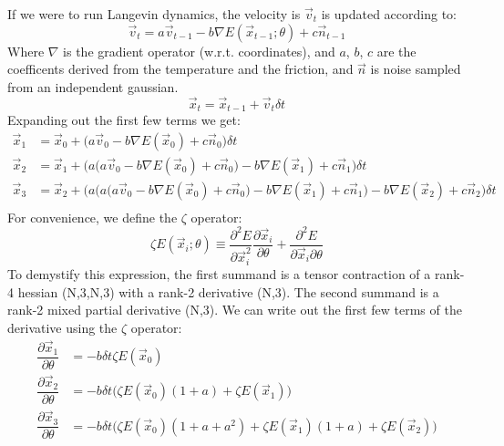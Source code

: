 \documentclass{article}
\begin{document}
If we were to run Langevin dynamics, the velocity is $\vec{v}_t$ is updated according to:
\begin{equation}
\vec{v}_t = a \vec{v}_{t-1} - b \nabla E(\vec{x}_{t-1};\theta) + c \vec{n}_{t-1}
\end{equation}
Where $\nabla$ is the gradient operator (w.r.t. coordinates), and $a$, $b$, $c$ are the coefficents derived from the temperature and the friction, and $\vec{n}$ is noise sampled from an independent gaussian.
\begin{equation}
\vec{x}_{t} = \vec{x}_{t-1} + \vec{v}_{t} \delta t
\end{equation}
Expanding out the first few terms we get:
\begin{equation}
\begin{split}
\vec{x}_1  &= \vec{x}_0 + \big(a \vec{v}_0 - b \nabla E(\vec{x}_0) + c \vec{n}_0  \big) \delta t \\
\vec{x}_2  &= \vec{x}_1 + \bigg( a \Big( a \vec{v}_0 - b \nabla E(\vec{x}_0) + c \vec{n}_0 \Big) - b \nabla E(\vec{x}_1) + c \vec{n}_1 \bigg) \delta t \\
\vec{x}_3  &= \vec{x}_2 + \Bigg(a\bigg(a \Big( a \vec{v}_0 - b \nabla E(\vec{x}_0) + c \vec{n}_0 \Big) - b \nabla E(\vec{x}_1) + c \vec{n}_1 \bigg) - b \nabla E(\vec{x}_2) + c \vec{n}_2 \Bigg) \delta t \\
\end{split}
\end{equation}
For convenience, we define the $\zeta$ operator:
\begin{equation}
\zeta E(\vec{x}_i; \theta) \equiv \dfrac{\partial^2E}{\partial\vec{x}_i^2}\dfrac{\partial\vec{x}_i}{\partial\theta} +  \dfrac{\partial^2 E}{\partial \vec{x}_i \partial \theta} 
\end{equation}
To demystify this expression, the first summand is a tensor contraction of a rank-4 hessian (N,3,N,3) with a rank-2 derivative (N,3). The second summand is a rank-2 mixed partial derivative (N,3). We can write out the first few terms of the derivative using the $\zeta$ operator:
\begin{equation}
\begin{split}
\dfrac{\partial\vec{x}_1}{\partial\theta}  &= - b\delta t \zeta E(\vec{x}_0) \\
\dfrac{\partial\vec{x}_2}{\partial\theta}  &= - b\delta t \Big(\zeta E(\vec{x}_0)(1+a)+\zeta E(\vec{x}_1)\Big)\\
\dfrac{\partial\vec{x}_3}{\partial\theta}  &= - b\delta t \Big(\zeta E(\vec{x}_0)(1+a+a^2)+\zeta E(\vec{x}_1)(1+a)+\zeta E(\vec{x}_2)\Big)\\
\end{split}
\end{equation}
\end{document}
